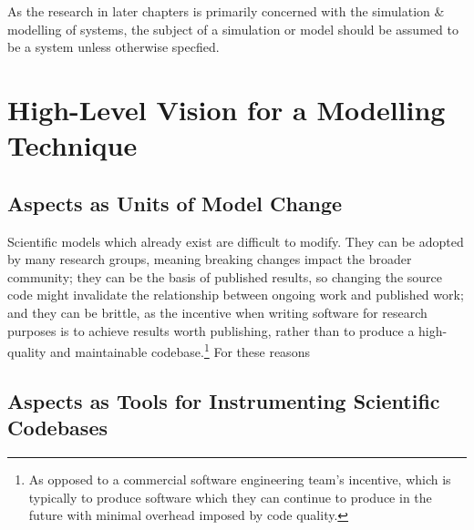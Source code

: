 As the research in later chapters is primarily concerned with the simulation \&
modelling of \sociotechnical systems, the subject of a simulation or model
should be assumed to be a \sociotechnical system unless otherwise specfied.




\section{High-Level Vision for a \SocioTechnical Modelling Technique}


\subsection{Aspects as Units of Model Change}


Scientific models which already exist are difficult to modify. They can be
adopted by many research groups, meaning breaking changes impact the broader
community; they can be the basis of published results, so changing the source
code might invalidate the relationship between ongoing work and published work;
and they can be brittle, as the incentive when writing software for research
purposes is to achieve results worth publishing, rather than to produce a
high-quality and maintainable codebase.\footnote{As opposed to a commercial
  software engineering team's incentive, which is typically to produce software
  which they can continue to produce in the future with minimal overhead imposed
  by code quality.} For these reasons

\subsection{Aspects as Tools for Instrumenting Scientific Codebases}

